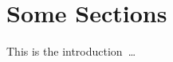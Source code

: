 \section{Some Sections}
\label{sec:sections}
This is the introduction~\cite{scipaper1, latex}\ldots


